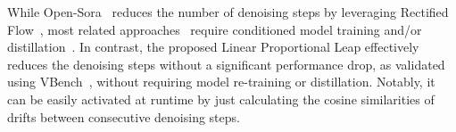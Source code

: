 

While Open-Sora~\cite{opensora} reduces the number of denoising steps by leveraging Rectified Flow~\cite{liu2022flow}, most related approaches~\cite{esser2024scaling,zhu2025slimflow} require conditioned model training and/or distillation~\cite{zhu2025slimflow}. In contrast, the proposed Linear Proportional Leap effectively reduces the denoising steps without a significant performance drop, as validated using VBench~\cite{huang2024vbench}, without requiring model re-training or distillation. Notably, it can be easily activated at runtime by just calculating the cosine similarities of drifts between consecutive denoising steps. 

